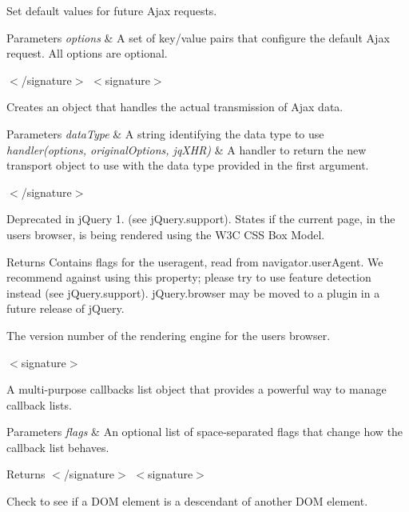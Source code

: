 Set default values for future Ajax requests.


\begin{DoxyParams}{Parameters}
{\em options} & A set of key/value pairs that configure the default Ajax request. All options are optional.\\
\hline
\end{DoxyParams}
$<$/signature$>$ $<$signature$>$ 

Creates an object that handles the actual transmission of Ajax data.


\begin{DoxyParams}{Parameters}
{\em data\+Type} & A string identifying the data type to use\\
\hline
{\em handler(options, original\+Options, jq\+X\+H\+R)} & A handler to return the new transport object to use with the data type provided in the first argument.\\
\hline
\end{DoxyParams}
$<$/signature$>$ 

Deprecated in j\+Query 1. (see j\+Query.\+support). States if the current page, in the user\textquotesingle{}s browser, is being rendered using the W3\+C C\+S\+S Box Model.

\begin{DoxyReturn}{Returns}
Contains flags for the useragent, read from navigator.\+user\+Agent. We recommend against using this property; please try to use feature detection instead (see j\+Query.\+support). j\+Query.\+browser may be moved to a plugin in a future release of j\+Query.

The version number of the rendering engine for the user\textquotesingle{}s browser.

$<$signature$>$ 

A multi-\/purpose callbacks list object that provides a powerful way to manage callback lists.
\end{DoxyReturn}

\begin{DoxyParams}{Parameters}
{\em flags} & An optional list of space-\/separated flags that change how the callback list behaves.\\
\hline
\end{DoxyParams}
\begin{DoxyReturn}{Returns}
$<$/signature$>$ $<$signature$>$ 

Check to see if a D\+O\+M element is a descendant of another D\+O\+M element.
\end{DoxyReturn}

